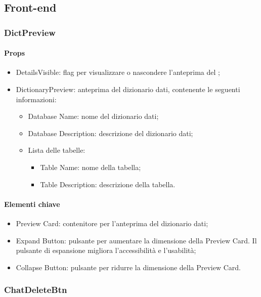 \subsection{Front-end}

\subsubsection{DictPreview}

\paragraph*{Props}
\begin{itemize}
  \item DetailsVisible: flag per visualizzare o nascondere l'anteprima del ;
  \item DictionaryPreview: anteprima del dizionario dati, contenente le seguenti informazioni:
  \begin{itemize}
    \item Database Name: nome del dizionario dati;
    \item Database Description: descrizione del dizionario dati;
    \item Lista delle tabelle: 
    \begin{itemize}
      \item Table Name: nome della tabella;
      \item Table Description: descrizione della tabella.
    \end{itemize}
  \end{itemize}
\end{itemize}

\paragraph*{Elementi chiave}
\begin{itemize}
  \item Preview Card: contenitore per l'anteprima del dizionario dati;
  \item Expand Button: pulsante per aumentare la dimensione della Preview Card. Il pulsante di espansione migliora l'accessibilità e l'usabilità;
  \item Collapse Button: pulsante per ridurre la dimensione della Preview Card.
\end{itemize}

\subsubsection{ChatDeleteBtn}

